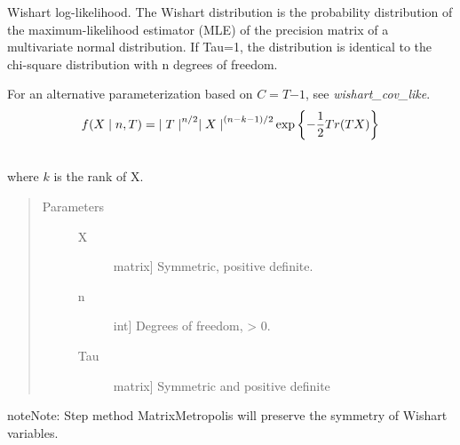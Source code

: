 \documentclass[letterpaper,10pt,english]{sphinxmanual}
\begin{document}
\begin{fulllineitems}
\label{distributions:pymc.distributions.wishart_like}
Wishart log-likelihood. The Wishart distribution is the probability
distribution of the maximum-likelihood estimator (MLE) of the precision
matrix of a multivariate normal distribution. If Tau=1, the distribution
is identical to the chi-square distribution with n degrees of freedom.

For an alternative parameterization based on $C=T{-1}$, see
\emph{wishart\_cov\_like}.
\begin{gather}
\begin{split}f(X \mid n, T) = {\mid T \mid}^{n/2}{\mid X \mid}^{(n-k-1)/2} \exp\left\{ -\frac{1}{2} Tr(TX) \right\}\end{split}\notag\\\begin{split}\end{split}\notag
\end{gather}
where $k$ is the rank of X.
\begin{quote}\begin{description}
\item[{Parameters }] \leavevmode\begin{description}
\item[{X}] \leavevmode{[}matrix{]}
Symmetric, positive definite.

\item[{n}] \leavevmode{[}int{]}
Degrees of freedom, \textgreater{} 0.

\item[{Tau}] \leavevmode{[}matrix{]}
Symmetric and positive definite

\end{description}

\end{description}\end{quote}

\begin{notice}{note}{Note:}
Step method MatrixMetropolis will preserve the symmetry of Wishart variables.
\end{notice}

\end{fulllineitems}

\end{document}
